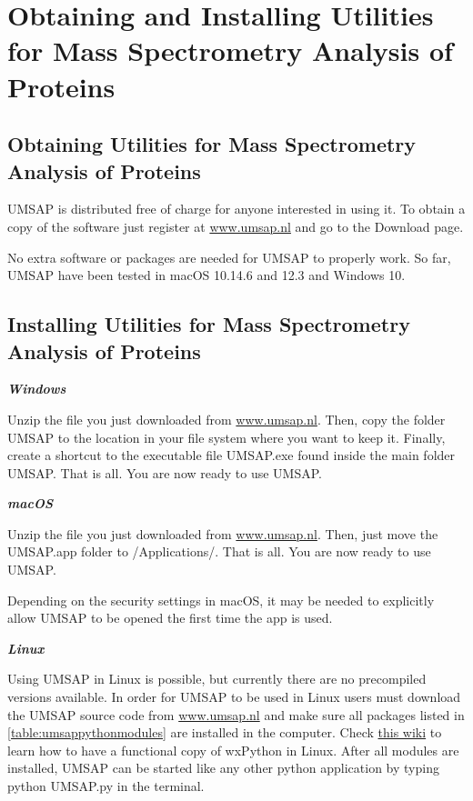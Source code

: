 \chapter{Obtaining and Installing Utilities for Mass Spectrometry Analysis of Proteins}

\section{Obtaining Utilities for Mass Spectrometry Analysis of Proteins}

UMSAP is distributed free of charge for anyone interested in using it. To obtain
a copy of the software just register at \href{https://www.umsap.nl}{www.umsap.nl}
and go to the Download page.

No extra software or packages are needed for UMSAP to properly work. So far, 
UMSAP have been tested in macOS \num[parse-numbers=false]{10.14.6} and
\num[parse-numbers=false]{12.3} and Windows \num{10}.

\section{Installing Utilities for Mass Spectrometry Analysis of Proteins}

\textit{\textbf{Windows}}

Unzip the file you just downloaded from \href{https://www.umsap.nl}{www.umsap.nl}.
Then, copy the folder UMSAP to the location in your file system where you want
to keep it. Finally, create a shortcut to the executable file UMSAP.exe found
inside the main folder UMSAP. That is all. You are now ready to use UMSAP.

\textit{\textbf{macOS}}

Unzip the file you just downloaded from \href{https://www.umsap.nl}{www.umsap.nl}.
Then, just move the UMSAP.app folder to /Applications/. That is all. You are now
ready to use UMSAP. 

Depending on the security settings in macOS, it may be needed to explicitly allow
UMSAP to be opened the first time the app is used.

\textit{\textbf{Linux}}

Using UMSAP in Linux is possible, but currently there are no precompiled versions
available. In order for UMSAP to be used in Linux users must download the UMSAP source
code from \href{https://www.umsap.nl}{www.umsap.nl} and make sure all packages listed
in \autoref{table:umsappythonmodules} are installed in the computer. Check 
\href{https://wiki.wxpython.org/How%20to%20install%20wxPython}{this wiki} to learn
how to have a functional copy of wxPython in Linux. After all modules are installed,
UMSAP can be started like any other python application by typing python UMSAP.py in
the terminal.

